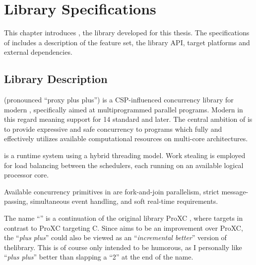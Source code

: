 
\chapter{Library Specifications}
\label{ch:library_specifications}


This chapter introduces \Proxc{}, the library developed for this thesis. The specifications of \Proxc{} includes a description of the feature set, the library API, target platforms and external dependencies. 


\section{Library Description}
\label{sec:library_overview}


\Proxc{} (pronounced ``proxy plus plus'') is a CSP\hyp{}influenced concurrency library for modern \Cpp{}, specifically aimed at multiprogrammed parallel programs. Modern \Cpp{} in this regard meaning support for \Cpp{}14 standard and later. The central ambition of \Proxc{} is to provide expressive and safe concurrency to \Cpp{} programs which fully and effectively utilizes available computational resources on multi\hyp{}core architectures.

\Proxc{} is a runtime system using a hybrid threading model. Work stealing is employed for load balancing between the schedulers, each running on an available logical processor core. 

Available concurrency primitives in \Proxc{} are fork\hyp{}and\hyp{}join parallelism, strict message\hyp{}passing, simultaneous event handling, and soft real\hyp{}time requirements.

The name ``\Proxc{}'' is a continuation of the original library ProXC \citep{pettersen2016proxc}, where \Proxc{} targets \Cpp{} in contrast to ProXC targeting C. Since \Proxc{} aims to be an improvement over ProXC, the ``\textit{plus plus}'' could also be viewed as an ``\textit{incremental better}'' version of thelibrary. This is of course only intended to be humorous, as I personally like ``\textit{plus plus}'' better than slapping a ``2'' at the end of the name.


